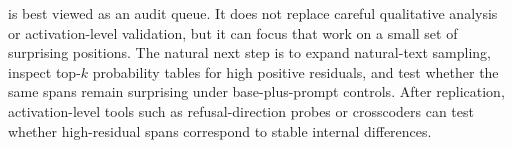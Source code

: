 \methodname is best viewed as an audit queue. It does not replace careful qualitative analysis or activation-level validation, but it can focus that work on a small set of surprising positions. The natural next step is to expand natural-text sampling, inspect top-$k$ probability tables for high positive residuals, and test whether the same spans remain surprising under base-plus-prompt controls. After replication, activation-level tools such as refusal-direction probes or crosscoders can test whether high-residual spans correspond to stable internal differences.
